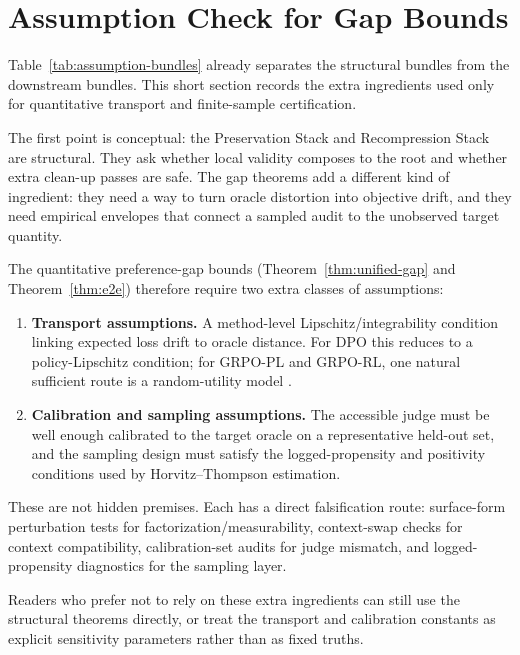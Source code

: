 \section{Assumption Check for Gap Bounds}\label{sec:verification}

Table~\ref{tab:assumption-bundles} already separates the structural bundles from the downstream bundles. This short section records the extra ingredients used only for quantitative transport and finite-sample certification.

The first point is conceptual: the Preservation Stack and Recompression Stack are structural. They ask whether local validity composes to the root and whether extra clean-up passes are safe. The gap theorems add a different kind of ingredient: they need a way to turn oracle distortion into objective drift, and they need empirical envelopes that connect a sampled audit to the unobserved target quantity.

The quantitative preference-gap bounds (Theorem~\ref{thm:unified-gap} and Theorem~\ref{thm:e2e}) therefore require two extra classes of assumptions:
\begin{enumerate}[leftmargin=1.5em]
    \item \textbf{Transport assumptions.} A method-level Lipschitz/integrability condition linking expected loss drift to oracle distance. For DPO this reduces to a policy-Lipschitz condition; for GRPO-PL and GRPO-RL, one natural sufficient route is a random-utility model \citep{Schervish1995}.
    \item \textbf{Calibration and sampling assumptions.} The accessible judge must be well enough calibrated to the target oracle on a representative held-out set, and the sampling design must satisfy the logged-propensity and positivity conditions used by Horvitz--Thompson estimation.
\end{enumerate}

These are not hidden premises. Each has a direct falsification route: surface-form perturbation tests for factorization/measurability, context-swap checks for context compatibility, calibration-set audits for judge mismatch, and logged-propensity diagnostics for the sampling layer.

Readers who prefer not to rely on these extra ingredients can still use the structural theorems directly, or treat the transport and calibration constants as explicit sensitivity parameters rather than as fixed truths.
